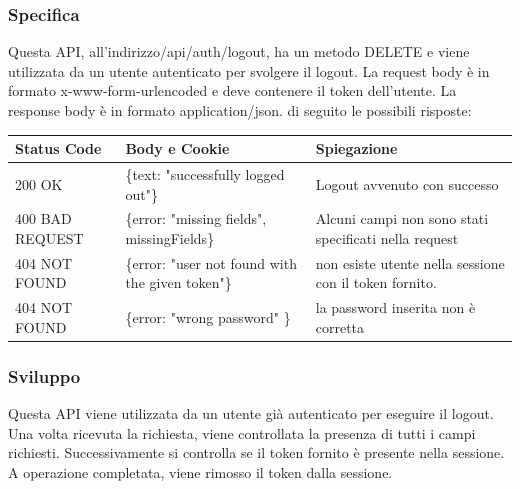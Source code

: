 \documentclass{report}
\begin{document}
\subsubsection*{Specifica}


Questa API, all'indirizzo/api/auth/logout, ha un metodo DELETE e viene utilizzata da un utente autenticato per svolgere il logout.
La request body è in formato x-www-form-urlencoded e deve contenere il token dell'utente.
La response body è in formato application/json. di seguito le possibili risposte:
\begin{center} %
	\centering
	\begin{tabular}{ |p{4cm}|p{5cm}|p{4cm}| }
		\hline
		\centering Status Code & \qquad\quad Body e Cookie & \qquad\qquad Spiegazione\\ %
		\hline
		200 OK & \{text: "successfully logged out"\} & Logout avvenuto con successo 	\\
		\hline
		400 BAD REQUEST & \{error: "missing fields", missingFields\} & Alcuni campi non sono stati specificati nella request\\ %
		\hline
		404 NOT FOUND & \{error: "user not found with the given token"\} & non esiste utente nella sessione con il token fornito.\\%
		\hline
		404 NOT FOUND & \{error: "wrong password" \} & la password inserita non è corretta \\
		\hline
		
	\end{tabular}
\end{center}
\subsubsection*{Sviluppo}
Questa API viene utilizzata da un utente già autenticato per eseguire il logout.
Una volta ricevuta la richiesta, viene controllata la presenza di tutti i campi richiesti.
Successivamente si controlla se il token fornito è presente nella sessione.
A operazione completata, viene rimosso il token dalla sessione.
\end{document}
